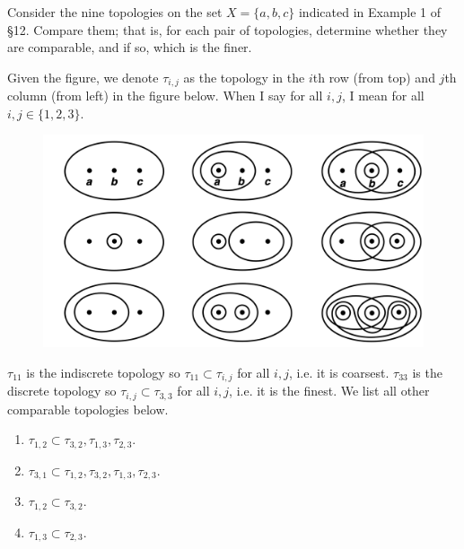   \begin{exercise}[Munkres 13.2]
    Consider the nine topologies on the set $X = \{a, b, c\}$ indicated in Example 1 of \S12. Compare them; that is, for each pair of topologies, determine whether they are comparable, and if so, which is the finer.
  \end{exercise}
  \begin{solution}[Munkres 13.2] 
    Given the figure, we denote $\tau_{i, j}$ as the topology in the $i$th row (from top) and $j$th column (from left) in the figure below. When I say for all $i, j$, I mean for all $i, j \in \{1, 2, 3\}$. 
    \begin{figure}[H]
      \centering 
      \includegraphics[scale=0.3]{img/top.png}
      \caption{} 
      \label{fig:top}
    \end{figure} 
    $\tau_{11}$ is the indiscrete topology so $\tau_{11} \subset \tau_{i, j}$ for all $i, j$, i.e. it is coarsest. $\tau_{33}$ is the discrete topology so $\tau_{i, j} \subset \tau_{3, 3}$ for all $i, j$, i.e. it is the finest. We list all other comparable topologies below. 
    \begin{enumerate}
      \item $\tau_{1, 2} \subset \tau_{3, 2}, \tau_{1, 3}, \tau_{2, 3}$. 
      \item $\tau_{3, 1} \subset \tau_{1, 2}, \tau_{3, 2}, \tau_{1, 3}, \tau_{2, 3}$. 
      \item $\tau_{1, 2} \subset \tau_{3, 2}$. 
      \item $\tau_{1, 3} \subset \tau_{2, 3}$. 
    \end{enumerate}
  \end{solution}

